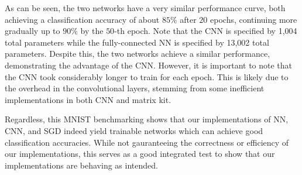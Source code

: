 As can be seen, the two networks have a very similar performance curve, both achieving a classification accuracy of about $85\%$ after $20$ epochs, continuing more gradually up to $90\%$ by the $50$-th epoch.
Note that the CNN is specified by 1,004 total parameters while the fully-connected NN is specified by 13,002 total parameters.
Despite this, the two networks achieve a similar performance, demonstrating the advantage of the CNN.
However, it is important to note that the CNN took considerably longer to train for each epoch.
This is likely due to the overhead in the convolutional layers, stemming from some inefficient implementations in both CNN and matrix kit.

Regardless, this MNIST benchmarking shows that our implementations of NN, CNN, and SGD indeed yield trainable networks which can achieve good classification accuracies.
While not gauranteeing the correctness or efficiency of our implementations, this serves as a good integrated test to show that our implementations are behaving as intended.